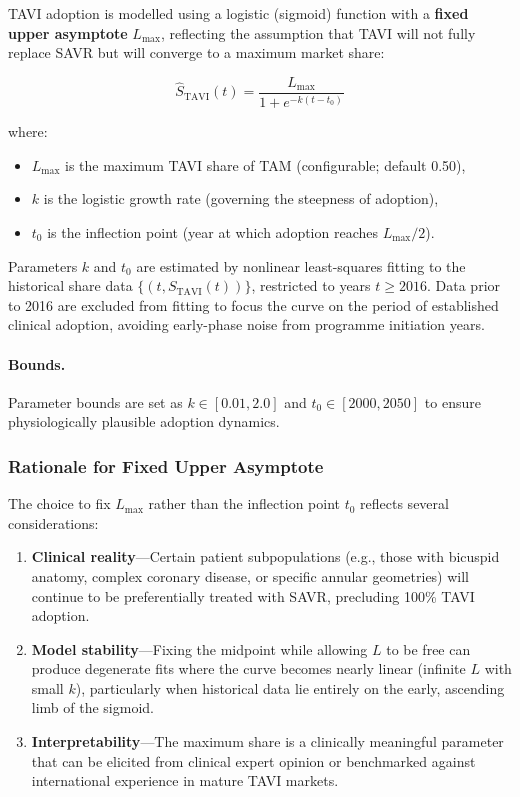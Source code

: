 \documentclass[12pt, a4paper]{article}
\begin{document}
TAVI adoption is modelled using a logistic (sigmoid) function with a \textbf{fixed upper asymptote} $L_{\max}$, reflecting the assumption that TAVI will not fully replace SAVR but will converge to a maximum market share:

\begin{equation}
    \hat{S}_{\mathrm{TAVI}}(t) = \frac{L_{\max}}{1 + e^{-k(t - t_0)}}
    \label{eq:sigmoid}
\end{equation}

\noindent where:
\begin{itemize}[leftmargin=*, itemsep=2pt]
    \item $L_{\max}$ is the maximum TAVI share of TAM (configurable; default 0.50),
    \item $k$ is the logistic growth rate (governing the steepness of adoption),
    \item $t_0$ is the inflection point (year at which adoption reaches $L_{\max}/2$).
\end{itemize}

Parameters $k$ and $t_0$ are estimated by nonlinear least-squares fitting to the historical share data $\{(t, S_{\mathrm{TAVI}}(t))\}$, restricted to years $t \geq 2016$. Data prior to 2016 are excluded from fitting to focus the curve on the period of established clinical adoption, avoiding early-phase noise from programme initiation years.

\paragraph{Bounds.}
Parameter bounds are set as $k \in [0.01, 2.0]$ and $t_0 \in [2000, 2050]$ to ensure physiologically plausible adoption dynamics.

\subsubsection{Rationale for Fixed Upper Asymptote}

The choice to fix $L_{\max}$ rather than the inflection point $t_0$ reflects several considerations:

\begin{enumerate}[leftmargin=*, itemsep=4pt]
    \item \textbf{Clinical reality}---Certain patient subpopulations (e.g., those with bicuspid anatomy, complex coronary disease, or specific annular geometries) will continue to be preferentially treated with SAVR, precluding 100\% TAVI adoption.
    \item \textbf{Model stability}---Fixing the midpoint while allowing $L$ to be free can produce degenerate fits where the curve becomes nearly linear (infinite $L$ with small $k$), particularly when historical data lie entirely on the early, ascending limb of the sigmoid.
    \item \textbf{Interpretability}---The maximum share is a clinically meaningful parameter that can be elicited from clinical expert opinion or benchmarked against international experience in mature TAVI markets.
\end{enumerate}
\end{document}
